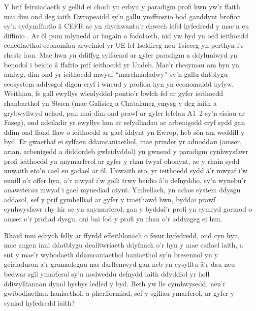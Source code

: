 Y brif feirniadaeth y gellid ei chodi yn erbyn y paradigm profi hwn yw'r ffaith mai dim ond deg iaith Ewropeaidd sy'n gallu ymffrostio bod ganddynt brofion sy'n cydymffurfio â CEFR ac yn rhychwantu'r chwech lefel hyfedredd y mae'n eu diffinio \parencite{noauthor_common_2025, noauthor_cadre_2025}. Ar ôl pum mlynedd ar hugain o fodolaeth, nid yw hyd yn oed ieithoedd cenedlaethol economïau arweiniol yr UE fel Iseldireg neu Tsieceg yn perthyn i'r rhestr hon. Mae hwn yn ddiffyg sylfaenol ar gyfer paradigm a ddyluniwyd yn benodol i beidio â ffafrio prif ieithoedd yr Undeb. Mae'r rhesymau am hyn yn amlwg, dim ond yr ieithoedd mwyaf ``marchnadadwy'' sy'n gallu datblygu ecosystem addysgol digon cryf i wneud y profion hyn yn economaidd hyfyw. Weithiau, fe gall ewyllys wleidyddol pontio'r bwlch fel ar gyfer ieithoedd rhanbarthol yn Sbaen (mae Galisieg a Chatalaneg ymysg y deg iaith a grybwyllwyd uchod, pan mai dim ond prawf ar gyfer lefelau A1–2 sy'n eisiau ar Faseg), ond adeiladir yr ewyllys hon ar sefydliadau ac arbenigedd cryf sydd gan ddim ond llond llaw o ieithoedd ar gael iddynt yn Ewrop, heb sôn am weddill y byd. Er gwaethaf ei sylfaen ddamcaniaethol, mae prinder yr adnoddau (amser, arian, arbenigedd a diddordeb gwleidyddol) yn gwneud y paradigm cynhwysfawr profi ieithoedd yn anymarferol ar gyfer y rhan fwyaf ohonynt, ac y rhain sydd unwaith eto’n cael eu gadael ar ôl. Unwaith eto, yr ieithoedd sydd â'r mwyaf i'w ennill o'r offer hyn, a'r mwyaf i'w golli trwy beidio â'u defnyddio, sy'n wynebu'r anawsterau mwyaf i gael mynediad atynt. Ymhellach, yn achos system ddysgu addasol, sef y prif gymhelliad ar gyfer y traethawd hwn, byddai prawf cynhwysfawr rhy hir ac yn anymarferol, gan y byddai'r profi yn cymryd gormod o amser o'r profiad dysgu, oni bai fod y profi yn rhan o'r addysgeg ei hun.

Rhaid inni edrych felly ar ffyrdd effeithlonach o fesur hyfedredd, ond cyn hyn, mae angen inni ddatblygu dealltwriaeth ddyfnach o'r hyn y mae caffael iaith, a sut y mae'r wybodaeth ddamcaniaethol haniaethol sy'n bresennol yn y geiriaduron a'r gramadegau nas darllemwyd gan neb yn cysylltu â'r dau neu bedwar sgîl ymarferol sy'n nodweddu defnydd iaith ddyddiol yr holl ddiwylliannau dynol hysbys ledled y byd. Beth yw lle cymhwysedd, neu'r gwibodiaethau haniaethol, a pherfformiad, sef y sgiliau ymarferol, ar gyfer y syniad hyfedredd iaith?

